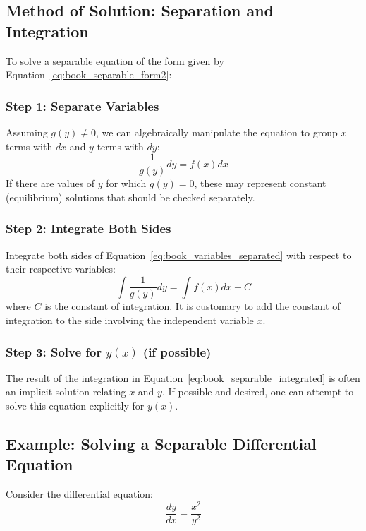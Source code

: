 \documentclass[12pt, letterpaper]{book}
\begin{document}
\subsection{Method of Solution: Separation and Integration}
\label{ssec:book_separable_solution_method}
To solve a separable equation of the form given by Equation~\ref{eq:book_separable_form2}:

\subsubsection{Step 1: Separate Variables}
Assuming $g(y) \neq 0$, we can algebraically manipulate the equation to group $x$ terms with $dx$ and $y$ terms with $dy$:
\begin{equation}
    \frac{1}{g(y)}dy = f(x)dx
    \label{eq:book_variables_separated}
\end{equation}
If there are values of $y$ for which $g(y)=0$, these may represent constant (equilibrium) solutions that should be checked separately.

\subsubsection{Step 2: Integrate Both Sides}
Integrate both sides of Equation~\ref{eq:book_variables_separated} with respect to their respective variables:
\begin{equation}
    \int \frac{1}{g(y)}dy = \int f(x)dx + C
    \label{eq:book_separable_integrated}
\end{equation}
where $C$ is the constant of integration. It is customary to add the constant of integration to the side involving the independent variable $x$.

\subsubsection{Step 3: Solve for $y(x)$ (if possible)}
The result of the integration in Equation~\ref{eq:book_separable_integrated} is often an implicit solution relating $x$ and $y$. If possible and desired, one can attempt to solve this equation explicitly for $y(x)$.

\subsection{Example: Solving a Separable Differential Equation}
\label{ssec:book_example_separable_de}
Consider the differential equation:
\begin{equation}
    \frac{dy}{dx} = \frac{x^2}{y^2}
    \label{eq:book_ex_separable_problem}
\end{equation}
\end{document}
